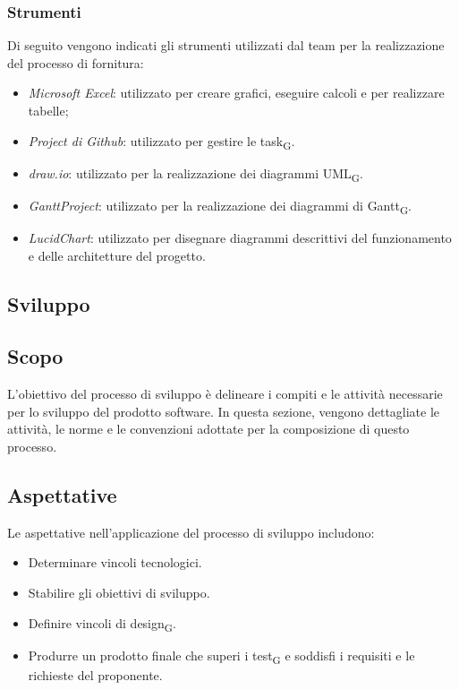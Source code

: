 \documentclass{article}
\begin{document}
\subsubsection*{Strumenti}
Di seguito vengono indicati gli strumenti utilizzati dal team per la realizzazione del processo di fornitura:\begin{itemize}
    \item \textit{Microsoft Excel}: utilizzato per creare grafici, eseguire calcoli e per realizzare tabelle;
    \item \textit{Project di Github}: utilizzato per gestire le task\textsubscript{G}.
    \item \textit{draw.io}: utilizzato per la realizzazione dei diagrammi UML\textsubscript{G}.
    \item \textit{GanttProject}: utilizzato per la realizzazione dei diagrammi di Gantt\textsubscript{G}.
    \item \textit{LucidChart}: utilizzato per disegnare diagrammi descrittivi del funzionamento e delle architetture del progetto.
\end{itemize}

\subsection{Sviluppo}

\subsection{Scopo}
L'obiettivo del processo di sviluppo è delineare i compiti e le attività necessarie per lo sviluppo del prodotto software. In questa sezione, vengono dettagliate le attività, le norme e le convenzioni adottate per la composizione di questo processo.

\subsection{Aspettative}
Le aspettative nell'applicazione del processo di sviluppo includono:
\begin{itemize}
    \item Determinare vincoli tecnologici.
    \item Stabilire gli obiettivi di sviluppo.
    \item Definire vincoli di design\textsubscript{G}.
    \item Produrre un prodotto finale che superi i test\textsubscript{G} e soddisfi i requisiti e le richieste del proponente.
\end{itemize}
\end{document}
